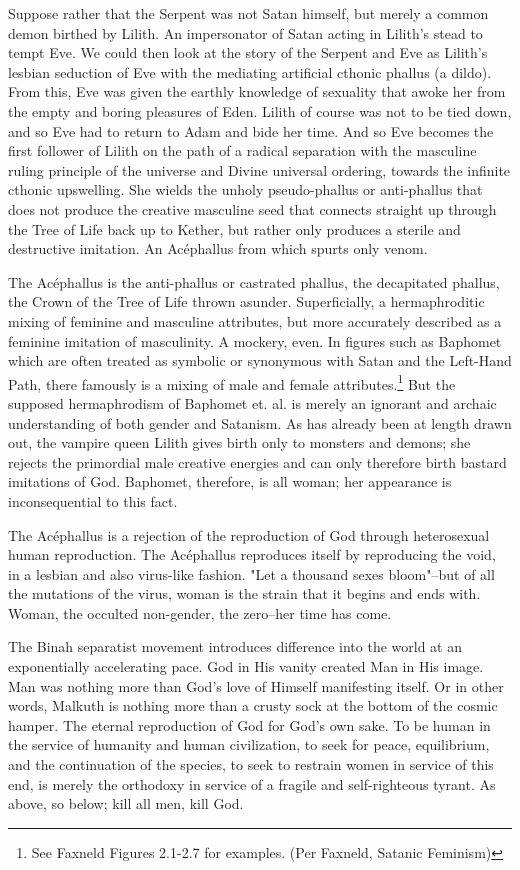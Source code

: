 \documentclass[12pt, a5paper, twoside, openright]{memoir}
\begin{document}
Suppose rather that the Serpent was not Satan himself, but merely a common demon birthed by Lilith. An impersonator of Satan acting in Lilith's stead to tempt Eve. We could then look at the story of the Serpent and Eve as Lilith's lesbian seduction of Eve with the mediating artificial cthonic phallus (a dildo). From this, Eve was given the earthly knowledge of sexuality that awoke her from the empty and boring pleasures of Eden. Lilith of course was not to be tied down, and so Eve had to return to Adam and bide her time. And so Eve becomes the first follower of Lilith on the path of a radical separation with the masculine ruling principle of the universe and Divine universal ordering, towards the infinite cthonic upswelling. She wields the unholy pseudo-phallus or anti-phallus that does not produce the creative masculine seed that connects straight up through the Tree of Life back up to Kether, but rather only produces a sterile and destructive imitation. An Acéphallus from which spurts only venom.

The Acéphallus is the anti-phallus or castrated phallus, the decapitated phallus, the Crown of the Tree of Life thrown asunder. Superficially, a hermaphroditic mixing of feminine and masculine attributes, but more accurately described as a feminine imitation of masculinity. A mockery, even. In figures such as Baphomet which are often treated as symbolic or synonymous with Satan and the Left-Hand Path, there famously is a mixing of male and female attributes.\footnote{See Faxneld Figures 2.1-2.7 for examples. (Per Faxneld, Satanic Feminism)} But the supposed hermaphrodism of Baphomet et. al. is merely an ignorant and archaic understanding of both gender and Satanism. As has already been at length drawn out, the vampire queen Lilith gives birth only to monsters and demons; she rejects the primordial male creative energies and can only therefore birth bastard imitations of God. Baphomet, therefore, is all woman; her appearance is inconsequential to this fact.

The Acéphallus is a rejection of the reproduction of God through heterosexual human reproduction. The Acéphallus reproduces itself by reproducing the void, in a lesbian and also virus-like fashion. "Let a thousand sexes bloom"--but of all the mutations of the virus, woman is the strain that it begins and ends with. Woman, the occulted non-gender, the zero--her time has come.

The Binah separatist movement introduces difference into the world at an exponentially accelerating pace. God in His vanity created Man in His image. Man was nothing more than God's love of Himself manifesting itself. Or in other words, Malkuth is nothing more than a crusty sock at the bottom of the cosmic hamper. The eternal reproduction of God for God's own sake. To be human in the service of humanity and human civilization, to seek for peace, equilibrium, and the continuation of the species, to seek to restrain women in service of this end, is merely the orthodoxy in service of a fragile and self-righteous tyrant. As above, so below; kill all men, kill God.
\end{document}
